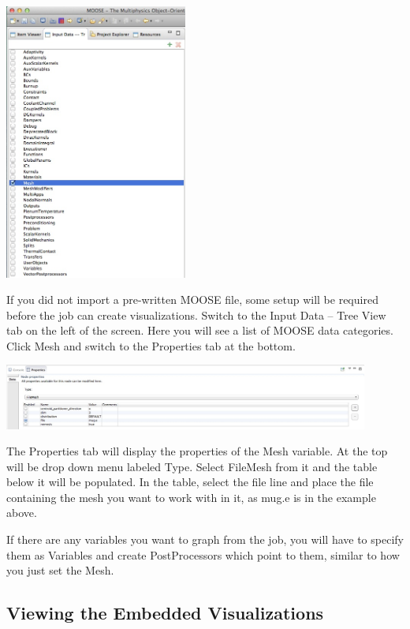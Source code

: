 \documentclass{article}
\begin{document}
\begin{center}
\includegraphics[width=6cm]{images/MOOSETree} 
\end{center}

If you did not import a pre-written MOOSE file, some setup will be
required before the job can create visualizations. Switch to the Input Data --
Tree View tab on the left of the screen. Here you will see a list of MOOSE data
categories. Click Mesh and switch to the Properties tab at the bottom.

\begin{center}
\includegraphics[width=12cm]{images/MeshProperty} 
\end{center}

The Properties tab will display the properties of the Mesh variable. At the top
will be drop down menu labeled Type. Select FileMesh from it and the table below
it will be populated. In the table, select the file line and place the file
containing the mesh you want to work with in it, as mug.e is in the example
above.

If there are any variables you want to graph from the job, you will have to
specify them as Variables and create PostProcessors which point to them,
similar to how you just set the Mesh. 

\subsection{Viewing the Embedded Visualizations} 
\end{document}
